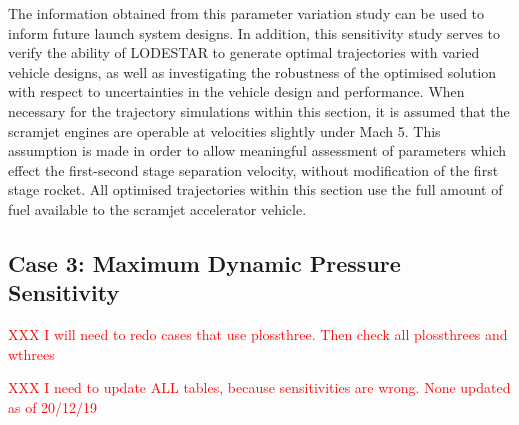 The information obtained from this parameter variation study can be used to inform future launch system designs. 
In addition, this sensitivity study serves to verify the ability of LODESTAR to generate optimal trajectories with varied vehicle designs, as well as investigating the robustness of the optimised solution with respect to uncertainties in the vehicle design and performance.
When necessary for the trajectory simulations within this section, it is assumed that the scramjet engines are operable at velocities slightly under Mach 5. This assumption is made in order to allow meaningful assessment of parameters which effect the first-second stage separation velocity, without modification of the first stage rocket.
All optimised trajectories within this section use the full amount of fuel available to the scramjet accelerator vehicle. 


\subsection{Case 3: Maximum Dynamic Pressure Sensitivity}\label{sec:qvariation}
\textcolor{red}{XXX I will need to redo cases that use plossthree. Then check all plossthrees and wthrees}

\textcolor{red}{XXX I need to update ALL tables, because sensitivities are wrong. None updated as of 20/12/19}

